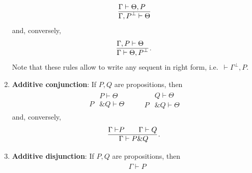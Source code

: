 \begin{enumerate}
\begin{gather}
                \begin{aligned}
                    &\Gamma\vdash\Theta,P\\
                    \hline
                    &\Gamma,P^\perp\vdash\Theta
                \end{aligned}
            \end{gather}
            and, conversely,
            \begin{gather}
                \label{quantum_information:negation_rule}
                \begin{aligned}
                    &\Gamma,P\vdash\Theta\\
                    \hline
                    &\Gamma\vdash\Theta,P^\perp
                \end{aligned}\,.
            \end{gather}
            Note that these rules allow to write any sequent in right form, i.e.~$\vdash\Gamma^\perp,P$.
        \item\textbf{Additive conjunction}: If $P,Q$ are propositions, then
            \begin{gather}
                \begin{aligned}
                    &P\vdash\Theta\\
                    \hline
                    P&\& Q\vdash\Theta
                \end{aligned}
                \qquad
                \begin{aligned}
                    &Q\vdash\Theta\\
                    \hline
                    P&\& Q\vdash\Theta
                \end{aligned}
            \end{gather}
            and, conversely,
            \begin{gather}
                \begin{aligned}
                    \Gamma\vdash&P\qquad\Gamma\vdash Q\\
                    \hline
                    &\Gamma\vdash P\&Q
                \end{aligned}\,.
            \end{gather}
        \item\textbf{Additive disjunction}: If $P,Q$ are propositions, then
            \begin{gather}
                \begin{aligned}
                    &\Gamma\vdash P\\

\end{aligned}
\end{gather}
\end{enumerate}
